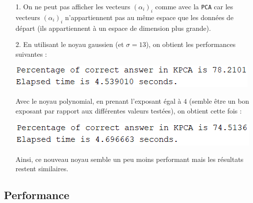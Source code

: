 \documentclass[a4paper, 11pt]{article}
\begin{document}
\begin{itemize}

	\item[1.] On ne peut pas afficher les vecteurs $\left( \alpha_{i} \right)_{i}$ comme avec la \texttt{PCA} car les vecteurs $\left( \alpha_{i} \right)_{i}$ n'appartiennent pas au même espace que les données de départ (ils appartiennent à un espace de dimension plus grande).
	
	\item[2.] En utilisant le noyau gaussien (et $\sigma = 13$), on obtient les performances suivantes : 
	
\begin{center}
	\includegraphics[scale=0.9]{kernel_gaussian_perf.PNG}
\end{center}

Avec le noyau polynomial, en prenant l'exposant égal à $4$ (semble être un bon exposant par rapport aux différentes valeurs testées), on obtient cette fois :

\begin{center}
	\includegraphics[scale=0.9]{kernel_poly_perf.PNG}
\end{center}

Ainsi, ce nouveau noyau semble un peu moins performant mais les résultats restent similaires.

\end{itemize}

\subsection{Performance}
\end{document}
